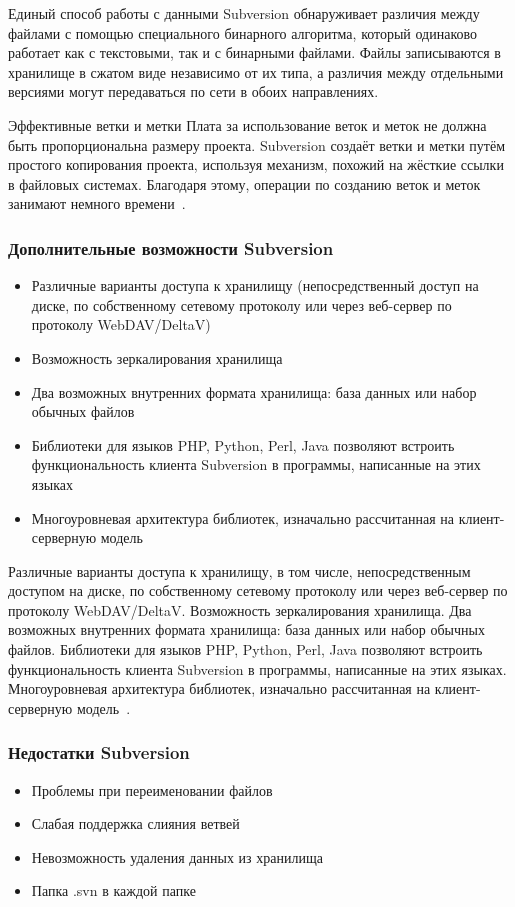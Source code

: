 \documentclass{../industrial-development}
\begin{document}
Единый способ работы с данными 
Subversion обнаруживает различия между файлами с помощью специального бинарного алгоритма, который одинаково работает как с текстовыми, так и с бинарными файлами. Файлы записываются в хранилище в сжатом виде независимо от их типа, а различия между отдельными версиями могут передаваться по сети в обоих направлениях.

Эффективные ветки и метки 
Плата за использование веток и меток не должна быть пропорциональна размеру проекта. Subversion создаёт ветки и метки путём простого копирования проекта, используя механизм, похожий на жёсткие ссылки в файловых системах. Благодаря этому, операции по созданию веток и меток занимают немного времени~\cite[с.~14--15]{VSwithSVN}.

\begin{frame} \frametitle{Дополнительные возможности Subversion}
  
  \begin{itemize}
  \item Различные варианты доступа к хранилищу (непосредственный доступ на диске, по собственному сетевому протоколу или через веб-сервер по протоколу WebDAV/DeltaV)
  \item Возможность зеркалирования хранилища
  \item Два возможных внутренних формата хранилища: база данных или набор обычных файлов
  \item Библиотеки для языков PHP, Python, Perl, Java позволяют встроить функциональность клиента Subversion в программы, написанные на этих языках
  \item Многоуровневая архитектура библиотек, изначально рассчитанная на клиент-серверную модель
  \end{itemize}
\end{frame}

\lecturenotes

Различные варианты доступа к хранилищу, в том числе, непосредственным доступом на диске, по собственному сетевому протоколу или через веб-сервер по протоколу WebDAV/DeltaV.
Возможность зеркалирования хранилища.
Два возможных внутренних формата хранилища: база данных или набор обычных файлов.
Библиотеки для языков PHP, Python, Perl, Java позволяют встроить функциональность клиента Subversion в программы, написанные на этих языках.
Многоуровневая архитектура библиотек, изначально рассчитанная на клиент-серверную модель~\cite{SVNMotu}.

\begin{frame} \frametitle{Недостатки Subversion}
  \begin{itemize}
  \item Проблемы при переименовании файлов
  \item Слабая поддержка слияния ветвей
  \item Невозможность удаления данных из хранилища
  \item Папка .svn в каждой папке
  \end{itemize}
\end{frame}
\end{document}
